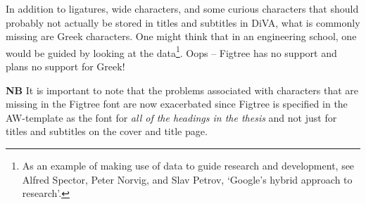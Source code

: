 \documentclass[12pt, twoside]{article}
\begin{document}
In addition to ligatures, wide characters, and some curious characters that should probably not actually be stored in titles and subtitles in DiVA, what is commonly missing are Greek characters. One might think that in an engineering school, one would be guided by looking at the data\footnote{As an example of making use of data to guide research and development, see Alfred Spector, Peter Norvig, and Slav Petrov, ‘Google’s hybrid approach to research’\cite{10.1145/2209249.2209262}.}. Oops -- Figtree has no support and plans no support for Greek!

\textbf{NB} It is important to note that the problems associated with characters that are missing in the Figtree font are now exacerbated since Figtree is specified in the AW-template as the font for \textit{all of the headings in the thesis} and not just for titles and subtitles on the cover and title page.
\end{document}
